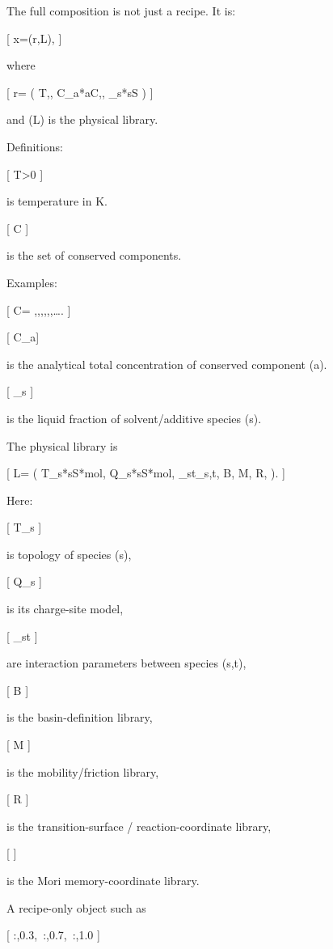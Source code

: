 The full composition is not just a recipe. It is:

[
x=(r,\mathcal L),
]

where

[
r=
\left(
T,,
{C_a}*{a\in\mathcal C},,
{\phi_s}*{s\in\mathcal S}
\right)
]

and (\mathcal L) is the physical library.

Definitions:

[
T>0
]

is temperature in K.

[
\mathcal C
]

is the set of conserved components.

Examples:

[
\mathcal C=
{,,,,,,\ldots}.
]

[
C_a
]

is the analytical total concentration of conserved component (a).

[
\phi_s
]

is the liquid fraction of solvent/additive species (s).

The physical library is

[
\mathcal L=
\left(
{\mathcal T_s}*{s\in\mathcal S*{\rm mol}},
{\mathcal Q_s}*{s\in\mathcal S*{\rm mol}},
{\Theta_{st}}_{s,t},
\mathcal B,
\mathcal M,
\mathcal R,
\mathcal \Psi
\right).
]

Here:

[
\mathcal T_s
]

is topology of species (s),

[
\mathcal Q_s
]

is its charge-site model,

[
\Theta_{st}
]

are interaction parameters between species (s,t),

[
\mathcal B
]

is the basin-definition library,

[
\mathcal M
]

is the mobility/friction library,

[
\mathcal R
]

is the transition-surface / reaction-coordinate library,

[
\mathcal\Psi
]

is the Mori memory-coordinate library.

A recipe-only object such as

[
{:,0.3,\ :,0.7,\ :,1.0}
]

